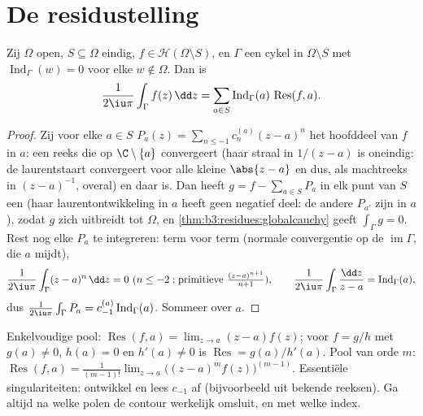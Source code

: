 \section{De residustelling}

\begin{theorem}[Residustelling]\label{thm:b3:residues:residue}
Zij $\Omega$ open, $S \subseteq \Omega$ eindig, $f \in \mathcal
H(\Omega\setminus S)$, en $\Gamma$ een cykel in $\Omega\setminus
S$ met $\operatorname{Ind}_\Gamma(w) = 0$ voor elke $w \notin
\Omega$. Dan is
\[
\frac{1}{2\iu\pi}\int_\Gamma f(z)\,\dd z
= \sum_{a\in S}\operatorname{Ind}_\Gamma(a)\,
\operatorname{Res}(f, a) .
\]
\end{theorem}

\begin{proof}
Zij voor elke $a \in S$ $P_a(z) = \sum_{n\leq-1}c_n^{(a)}(z -
a)^n$ het hoofddeel van $f$ in $a$: een reeks die op
$\C\setminus\{a\}$ convergeert (haar straal in $1/(z-a)$ is
oneindig: de laurentstaart convergeert voor alle kleine $\abs
{z-a}$ en dus, als machtreeks in $(z-a)^{-1}$, overal) en daar
 is. Dan heeft $g = f - \sum_{a\in S}P_a$ in elk punt van
$S$ een  (haar laurentontwikkeling in $a$
heeft geen negatief deel: de andere $P_{a'}$ zijn  in
$a$), zodat $g$ zich  uitbreidt tot $\Omega$, en
\cref{thm:b3:residues:globalcauchy} geeft $\int_\Gamma g = 0$.
Rest nog elke $P_a$ te integreren: term voor term (normale
convergentie op de  $\operatorname{im}\Gamma$, die $a$
mijdt),
\[
\frac1{2\iu\pi}\int_\Gamma(z - a)^n\,\dd z = 0 \ (n \leq -2:
\text{primitieve } \tfrac{(z-a)^{n+1}}{n+1}),
\qquad
\frac1{2\iu\pi}\int_\Gamma\frac{\dd z}{z - a} =
\operatorname{Ind}_\Gamma(a),
\]
dus $\frac1{2\iu\pi}\int_\Gamma P_a =
c_{-1}^{(a)}\operatorname{Ind}_\Gamma(a)$. Sommeer over $a$.
\end{proof}

\begin{method}\label{met:b3:residues:compute}
Enkelvoudige pool: $\operatorname{Res}(f, a) = \lim_{z\to a}(z -
a)f(z)$; voor $f = g/h$ met $g(a) \neq 0$, $h(a) = 0$ en $h'(a)
\neq 0$ is $\operatorname{Res} = g(a)/h'(a)$. Pool van orde $m$:
$\operatorname{Res}(f, a) = \frac1{(m-1)!}\lim_{z\to
a}\bigl((z-a)^mf(z)\bigr)^{(m-1)}$. Essentiële singulariteiten:
ontwikkel en lees $c_{-1}$ af (bijvoorbeeld uit bekende reeksen).
Ga altijd na welke polen de contour werkelijk omsluit, en met
welke index.
\end{method}

